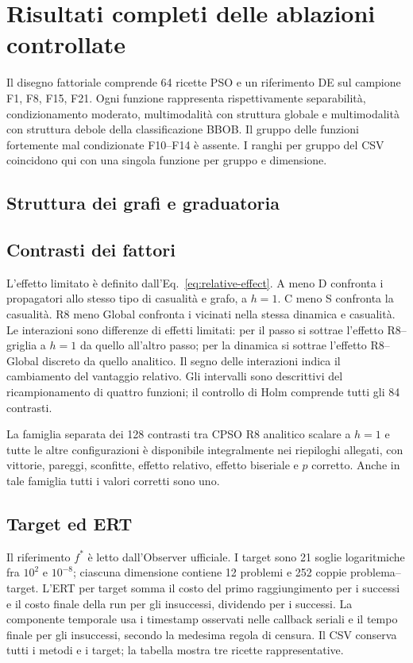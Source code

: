 \section{Risultati completi delle ablazioni controllate}\label{app:controlled-results}
Il disegno fattoriale comprende 64 ricette PSO e un riferimento DE sul campione F1, F8, F15, F21. Ogni funzione rappresenta rispettivamente separabilità, condizionamento moderato, multimodalità con struttura globale e multimodalità con struttura debole della classificazione BBOB. Il gruppo delle funzioni fortemente mal condizionate F10--F14 è assente. I ranghi per gruppo del CSV coincidono qui con una singola funzione per gruppo e dimensione.
\subsection{Struttura dei grafi e graduatoria}


\subsection{Contrasti dei fattori}
L'effetto limitato è definito dall'Eq.~\eqref{eq:relative-effect}. A meno D confronta i propagatori allo stesso tipo di casualità e grafo, a $h=1$. C meno S confronta la casualità. R8 meno Global confronta i vicinati nella stessa dinamica e casualità. Le interazioni sono differenze di effetti limitati: per il passo si sottrae l'effetto R8--griglia a $h=1$ da quello all'altro passo; per la dinamica si sottrae l'effetto R8--Global discreto da quello analitico. Il segno delle interazioni indica il cambiamento del vantaggio relativo. Gli intervalli sono descrittivi del ricampionamento di quattro funzioni; il controllo di Holm comprende tutti gli 84 contrasti.

La famiglia separata dei 128 contrasti tra CPSO R8 analitico scalare a $h=1$ e tutte le altre configurazioni è disponibile integralmente nei riepiloghi allegati, con vittorie, pareggi, sconfitte, effetto relativo, effetto biseriale e $p$ corretto. Anche in tale famiglia tutti i valori corretti sono uno.
\subsection{Target ed ERT}
Il riferimento $f^*$ è letto dall'Observer ufficiale. I target sono 21 soglie logaritmiche fra $10^2$ e $10^{-8}$; ciascuna dimensione contiene 12 problemi e 252 coppie problema--target. L'ERT per target somma il costo del primo raggiungimento per i successi e il costo finale della run per gli insuccessi, dividendo per i successi. La componente temporale usa i timestamp osservati nelle callback seriali e il tempo finale per gli insuccessi, secondo la medesima regola di censura. Il CSV conserva tutti i metodi e i target; la tabella mostra tre ricette rappresentative.

